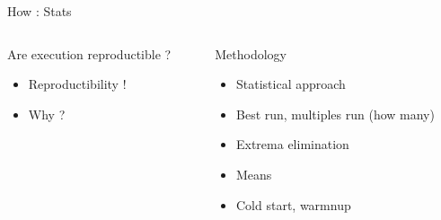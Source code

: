 %
\begin{Frame}{How : Stats}
  \begin{columns}[t]
    \begin{column}{5cm} %
      \begin{block}{Are execution reproductible ?}
        \begin{itemize}
        \item Reproductibility !
        \item Why ?
        \end{itemize}
      \end{block} 
    \end{column}
    
    \begin{column}{5cm} %
      \begin{block}{Methodology}
        \begin{itemize}
        \item Statistical approach
        \item Best run, multiples run (how many)
        \item Extrema elimination
        \item Means
        \item Cold start, warmnup
        \end{itemize}
      \end{block}   
    \end{column}
  \end{columns}  
\end{Frame}


